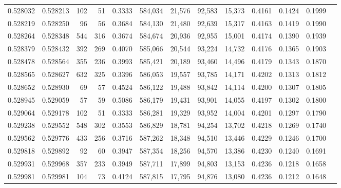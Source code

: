 \begin{tabular}{rrrrrrrrrrrrr}
0.528032 & 0.528213 &   102 &    51 &                                     0.3333 & 584,034 &  21,576 &  92,583 &  15,373 & 0.4161 & 0.1424 & 0.1999 \\
0.528219 & 0.528250 &    96 &    56 &                                     0.3684 & 584,130 &  21,480 &  92,639 &  15,317 & 0.4163 & 0.1419 & 0.1990 \\
0.528264 & 0.528348 &   544 &   316 &                                     0.3674 & 584,674 &  20,936 &  92,955 &  15,001 & 0.4174 & 0.1390 & 0.1939 \\
0.528379 & 0.528432 &   392 &   269 &                                     0.4070 & 585,066 &  20,544 &  93,224 &  14,732 & 0.4176 & 0.1365 & 0.1903 \\
0.528478 & 0.528564 &   355 &   236 &                                     0.3993 & 585,421 &  20,189 &  93,460 &  14,496 & 0.4179 & 0.1343 & 0.1870 \\
0.528565 & 0.528627 &   632 &   325 &                                     0.3396 & 586,053 &  19,557 &  93,785 &  14,171 & 0.4202 & 0.1313 & 0.1812 \\
0.528652 & 0.528930 &    69 &    57 &                                     0.4524 & 586,122 &  19,488 &  93,842 &  14,114 & 0.4200 & 0.1307 & 0.1805 \\
0.528945 & 0.529059 &    57 &    59 &                                     0.5086 & 586,179 &  19,431 &  93,901 &  14,055 & 0.4197 & 0.1302 & 0.1800 \\
0.529064 & 0.529178 &   102 &    51 &                                     0.3333 & 586,281 &  19,329 &  93,952 &  14,004 & 0.4201 & 0.1297 & 0.1790 \\
0.529238 & 0.529552 &   548 &   302 &                                     0.3553 & 586,829 &  18,781 &  94,254 &  13,702 & 0.4218 & 0.1269 & 0.1740 \\
0.529562 & 0.529776 &   433 &   256 &                                     0.3716 & 587,262 &  18,348 &  94,510 &  13,446 & 0.4229 & 0.1246 & 0.1700 \\
0.529818 & 0.529892 &    92 &    60 &                                     0.3947 & 587,354 &  18,256 &  94,570 &  13,386 & 0.4230 & 0.1240 & 0.1691 \\
0.529931 & 0.529968 &   357 &   233 &                                     0.3949 & 587,711 &  17,899 &  94,803 &  13,153 & 0.4236 & 0.1218 & 0.1658 \\
0.529981 & 0.529981 &   104 &    73 &                                     0.4124 & 587,815 &  17,795 &  94,876 &  13,080 & 0.4236 & 0.1212 & 0.1648 \\

\end{tabular}
